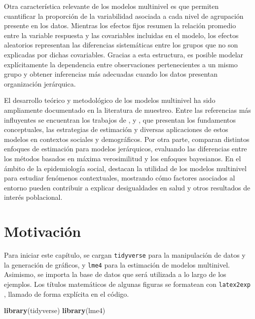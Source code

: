 \documentclass[
  spanish,
  12pt,
]{book}
\newenvironment{Shaded}{\begin{snugshade}}{\end{snugshade}}
\newcommand{\FunctionTok}[1]{\textcolor[rgb]{0.13,0.29,0.53}{\textbf{#1}}}
\newcommand{\NormalTok}[1]{#1}
\begin{document}
Otra característica relevante de los modelos multinivel es que permiten cuantificar la proporción de la variabilidad asociada a cada nivel de agrupación presente en los datos. Mientras los efectos fijos resumen la relación promedio entre la variable respuesta y las covariables incluidas en el modelo, los efectos aleatorios representan las diferencias sistemáticas entre los grupos que no son explicadas por dichas covariables. Gracias a esta estructura, es posible modelar explícitamente la dependencia entre observaciones pertenecientes a un mismo grupo y obtener inferencias más adecuadas cuando los datos presentan organización jerárquica.

El desarrollo teórico y metodológico de los modelos multinivel ha sido ampliamente documentado en la literatura de muestreo. Entre las referencias más influyentes se encuentran los trabajos de \citet{goldstein2011multilevel}, \citet{gelman2006data} y \citet{rabehesketh2012multilevel}, que presentan los fundamentos conceptuales, las estrategias de estimación y diversas aplicaciones de estos modelos en contextos sociales y demográficos. Por otra parte, \citet{browne2006comparison} comparan distintos enfoques de estimación para modelos jerárquicos, evaluando las diferencias entre los métodos basados en máxima verosimilitud y los enfoques bayesianos. En el ámbito de la epidemiología social, \citet{merlo2006brief} destacan la utilidad de los modelos multinivel para estudiar fenómenos contextuales, mostrando cómo factores asociados al entorno pueden contribuir a explicar desigualdades en salud y otros resultados de interés poblacional.

\section{Motivación}\label{sec-motivacionMult}

Para iniciar este capítulo, se cargan \texttt{tidyverse} \citep{tidyverse2026} para la manipulación de datos y la generación de gráficos, y \texttt{lme4} \citep{lme42026} para la estimación de modelos multinivel. Asimismo, se importa la base de datos que será utilizada a lo largo de los ejemplos. Los títulos matemáticos de algunas figuras se formatean con \texttt{latex2exp} \citep{latex2exp2026}, llamado de forma explícita en el código.

\begin{Shaded}
\begin{Highlighting}[]
\FunctionTok{library}\NormalTok{(tidyverse)}
\FunctionTok{library}\NormalTok{(lme4)}
\end{Highlighting}
\end{Shaded}
\end{document}
